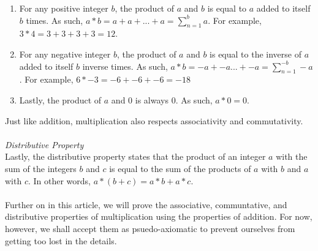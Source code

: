 \documentclass[a4paper,12pt]{article}
\begin{document}
\begin{enumerate}
\item For any positive integer $b$, the product of $a$ and $b$ is equal to $a$ added to itself $b$ times. As such, $a * b = a + a + ... + a =\sum_{n=1}^{b}a$. For example, $3 * 4 = 3 + 3 + 3 + 3 = 12$.
\item For any negative integer $b$, the product of $a$ and $b$ is equal to the inverse of $a$ added to itself $b$ inverse times. As such, $a * b = -a + -a ... + -a = \sum_{n=1}^{-b}-a$. For example, $6 * -3 = -6 + -6 + -6 = -18$
\item Lastly, the product of $a$ and $0$ is always $0$. As such, $a*0 = 0$.
\end{enumerate}
Just like addition, multiplication also respects associativity and commutativity.\\  
\\
\textit{Distributive Property}\\
Lastly, the distributive property states that the product of an integer $a$ with the sum of the integers $b$ and $c$ is equal to the sum of the products of $a$ with $b$ and $a$ with $c$. In other words, $a*(b + c) = a*b + a*c$.\\ 
\\
Further on in this article, we will prove the associative, communtative, and distributive properties of multiplication using the properties of addition. For now, however, we shall accept them as psuedo-axiomatic to prevent ourselves from getting too lost in the details.
\end{document}
